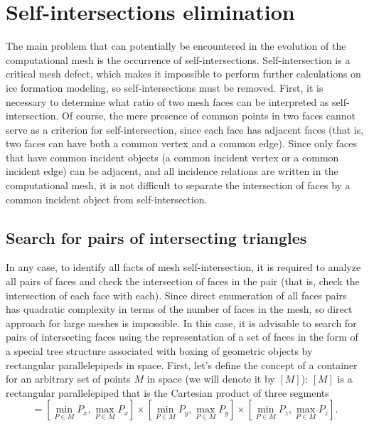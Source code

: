 \documentclass[
11pt,
tightenlines,
twoside,
onecolumn,
nofloats,
nobibnotes,
nofootinbib,
superscriptaddress,
noshowpacs,
centertags]
{revtex4}
\begin{document}

\section{Self-intersections elimination}

The main problem that can potentially be encountered in the evolution of the computational mesh is the occurrence of self-intersections.
Self-intersection is a critical mesh defect, which makes it impossible to perform further calculations on ice formation modeling, so self-intersections must be removed.
First, it is necessary to determine what ratio of two mesh faces can be interpreted as self-intersection.
Of course, the mere presence of common points in two faces cannot serve as a criterion for self-intersection, since each face has adjacent faces (that is, two faces can have both a common vertex and a common edge).
Since only faces that have common incident objects  (a common
incident vertex or a common incident edge) can be adjacent, and all
incidence relations are written in the computational mesh, it is not
difficult to separate the intersection of faces by a common incident
object from self-intersection.

\subsection{Search for pairs of intersecting triangles}

In any case, to identify all facts of mesh self-intersection, it is required to analyze all pairs of faces and check the intersection of faces in the pair (that is, check the intersection of each face with each).
Since direct enumeration of all faces pairs has quadratic complexity in terms of the number of faces in the mesh, so direct approach for large meshes is impossible.
In this case, it is advisable to search for pairs of intersecting faces using the representation of a set of faces in the form of a special tree structure associated with boxing of geometric objects by rectangular parallelepipeds in space.
First, let's define the concept of a container for an  arbitrary set
of points $M$ in space (we will denote it by $[M]$): $[M]$ is a
rectangular parallelepiped that is the Cartesian product of three
segments
\begin{equation*}
[M] = \left[\min_{P \in M}{P_x}, \max_{P \in M}{P_x}\right]
      \times \left[\min_{P \in M}{P_y}, \max_{P \in M}{P_y}\right]
      \times \left[\min_{P \in M}{P_z}, \max_{P \in M}{P_z}\right].
\end{equation*}
\end{document}
